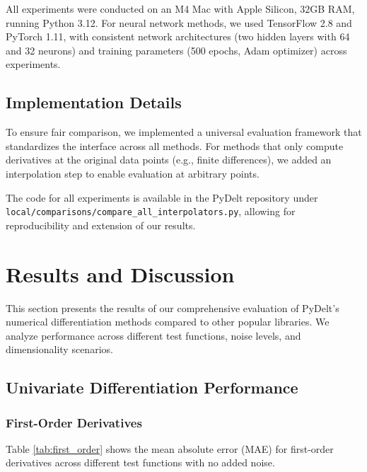\documentclass[11pt,a4paper]{article}
\begin{document}
All experiments were conducted on an M4 Mac with Apple Silicon, 32GB RAM, running Python 3.12. For neural network methods, we used TensorFlow 2.8 and PyTorch 1.11, with consistent network architectures (two hidden layers with 64 and 32 neurons) and training parameters (500 epochs, Adam optimizer) across experiments.

\subsection{Implementation Details}

To ensure fair comparison, we implemented a universal evaluation framework that standardizes the interface across all methods. For methods that only compute derivatives at the original data points (e.g., finite differences), we added an interpolation step to enable evaluation at arbitrary points.

The code for all experiments is available in the PyDelt repository under \texttt{local/comparisons/compare\_all\_interpolators.py}, allowing for reproducibility and extension of our results.

\section{Results and Discussion}

This section presents the results of our comprehensive evaluation of PyDelt's numerical differentiation methods compared to other popular libraries. We analyze performance across different test functions, noise levels, and dimensionality scenarios.

\subsection{Univariate Differentiation Performance}

\subsubsection{First-Order Derivatives}

Table \ref{tab:first_order} shows the mean absolute error (MAE) for first-order derivatives across different test functions with no added noise.
\end{document}
